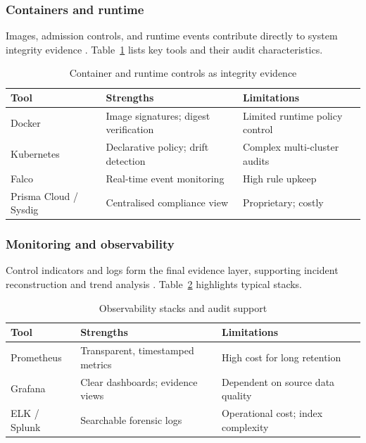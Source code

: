 \subsubsection*{Containers and runtime}

Images, admission controls, and runtime events contribute directly to system
integrity evidence \cite{anisetti_devsecops-based_2022,
elbaghazaoui_integrating_2025-1}. Table~\ref{tab:containers_runtime} lists key
tools and their audit characteristics.

\begin{table}[h]
  \centering
  \caption{Container and runtime controls as integrity evidence}
  \label{tab:containers_runtime}
  \begin{tabular}{@{}lll@{}}
    \toprule
    Tool & Strengths & Limitations \\
    \midrule
    Docker & Image signatures; digest verification & Limited runtime policy control \\
    Kubernetes & Declarative policy; drift detection & Complex multi-cluster audits \\
    Falco & Real-time event monitoring & High rule upkeep \\
    Prisma Cloud / Sysdig & Centralised compliance view & Proprietary; costly \\
    \bottomrule
  \end{tabular}
\end{table}

\subsubsection*{Monitoring and observability}

Control indicators and logs form the final evidence layer, supporting incident
reconstruction and trend analysis
\cite{anisetti_devsecops-based_2022, elbaghazaoui_safeguarding_2025}.
Table~\ref{tab:observability} highlights typical stacks.

\begin{table}[h]
  \centering
  \caption{Observability stacks and audit support}
  \label{tab:observability}
  \begin{tabular}{@{}lll@{}}
    \toprule
    Tool & Strengths & Limitations \\
    \midrule
    Prometheus & Transparent, timestamped metrics &
    High cost for long retention \\
    Grafana & Clear dashboards; evidence views &
    Dependent on source data quality \\
    ELK / Splunk & Searchable forensic logs &
    Operational cost; index complexity \\
    \bottomrule
  \end{tabular}
\end{table}


